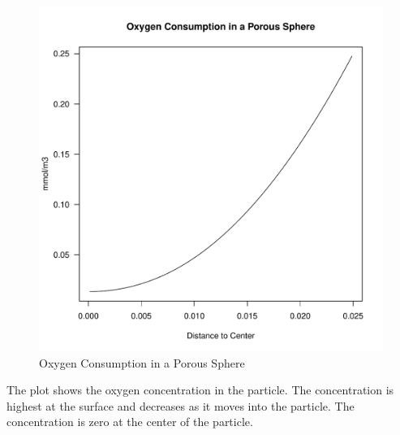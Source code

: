 \documentclass{tufte-handout}\usepackage[]{graphicx}\usepackage[]{xcolor}
\makeatletter
\def\maxwidth{ %
  \ifdim\Gin@nat@width>\linewidth
    \linewidth
  \else
    \Gin@nat@width
  \fi
}
\newenvironment{knitrout}{}{} %
\makeatother
\begin{document}
\begin{figure}
\centering
\caption{Oxygen Consumption in a Porous Sphere}
\begin{knitrout}
\color{fgcolor}
\includegraphics[width=\maxwidth]{figure/plotO2agg-1} 
\end{knitrout}
\end{figure}

The plot shows the oxygen concentration in the particle. The concentration is highest at the surface and decreases as it moves into the particle. The concentration is zero at the center of the particle.
\end{document}
